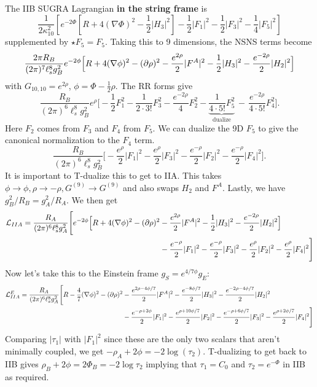 \documentclass[11pt, class=article, crop=false]{standalone}
\begin{document}
\begin{enumerate}
	The IIB SUGRA Lagrangian \textbf{in the string frame} is
	\[
		\frac{1}{2\kappa_{10}^2}  \left[ e^{-2\Phi} \left[R + 4 (\nabla \Phi)^2 - \frac12 |H_3|^2 \right] - \frac12 |F_1|^2 - \frac12 |F_3|^2 - \frac14 |F_5|^2  \right]
	\]
	supplemented by $\star F_5 = F_5$. Taking this to 9 dimensions, the NSNS terms become
	\[
		\frac{2\pi R_B}{(2\pi)^7 \ell_s^8 g_B^2} e^{-2 \phi} \Big[R + 4 (\nabla \phi)^2 - (\partial \rho)^2  - \frac{e^{2\rho}}{2} |F^A|^2  - \frac{1}{2} |H_3|^2 - \frac{e^{-2\rho}}{2} |H_2|^2 \Big]
	\]
	with $G_{10,10} = e^{2 \rho}$, $\phi = \Phi - \frac12 \rho$. The RR forms give
	\[
		\frac{R_B}{(2\pi)^6 \ell_s^8 g_B^2} e^{\rho} \Big[ -\frac12 F_1^2 - \frac{1}{2 \cdot 3!} F_3^2 - \frac{e^{-2 \rho}}{4} F_2^2 - \underbrace{\frac{1}{4 \cdot 5!} F_5^2}_{\text{dualize}} \, -  \, \frac{e^{-2\rho}}{4 \cdot 5!} F_4^2 \Big].
	\]
	Here $F_2$ comes from $F_3$ and $F_4$ from $F_5$. We can dualize the 9D $F_5$ to give the canonical normalization to the $F_4$ term.
	\[
		\frac{R_B}{(2\pi)^6 \ell_s^8 g_B^2} \Big[ -\frac{e^\rho}{2} |F_1|^2 - \frac{e^{\rho}}{2} |F_3|^2 - \frac{e^{-\rho}}{2} |F_2|^2 - \frac{e^{-\rho}}{2} |F_4|^2 \Big].
	\]
	It is important to T-dualize this to get to IIA. This takes $\phi \to \phi, \rho \to - \rho, G^{(9)} \to G^{(9)}$ and also swaps $H_2$ and $F^A$. Lastly, we have $g_B^2/R_B = g_A^2/R_A$. We then get
	\[
	\begin{aligned}
		\mathcal L_{IIA} = \frac{R_A}{(2\pi)^6 \ell_s^8 g_A^2} \Bigg[ e^{-2\phi} \Big[R  + 4 (\nabla \phi)^2 - (\partial \rho)^2 
		&- \frac{e^{2\rho}}{2} |F^A|^2  - \frac{1}{2} |H_3|^2 - \frac{e^{-2\rho}}{2} |H_2|^2 \Big]\\
		 &-\frac{e^{-\rho}}{2} |F_1|^2 - \frac{e^{-\rho}}{2} |F_3|^2 - \frac{e^{\rho}}{2} |F_2|^2 - \frac{e^{\rho}}{2} |F_4|^2 \Bigg]
	\end{aligned}
	\]
	Now let's take this to the Einstein frame $g_S = e^{4/7 \phi} g_{E}$: 
	\[
	\begin{aligned}
		\mathcal L_{IIA}^E = \frac{R_A}{(2\pi)^6 \ell_s^8 g_A^2} \Bigg[ R  - \frac47 (\nabla \phi)^2 - (\partial \rho)^2 
		&- \frac{e^{2\rho - 4 \phi/7}}{2} |F^A|^2  - \frac{e^{-8\phi/7}}{2} |H_3|^2 - \frac{e^{-2\rho-4 \phi/7}}{2} |H_2|^2 \\
		 &-\frac{e^{-\rho + 2 \phi}}{2} |F_1|^2 - \frac{e^{\rho + 10 \phi/7}}{2} |F_2|^2  - \frac{e^{-\rho + 6 \phi/7}}{2} |F_3|^2 - \frac{e^{\rho + 2 \phi/7}}{2} |F_4|^2 \Bigg]
	\end{aligned}
	\]
	Comparing $|\tau_1|$ with $|F_1|^2$ since these are the only two scalars that aren't minimally coupled, we get $-\rho_A + 2 \phi = - 2 \log(\tau_2)$. T-dualizing to get back to IIB gives $\rho_B + 2 \phi = 2 \Phi_B = - 2 \log \tau_2$ implying that $\tau_1 = C_0$ and $\tau_2 = e^{- \Phi}$ in IIB as required. 
	

\end{enumerate}
\end{document}
